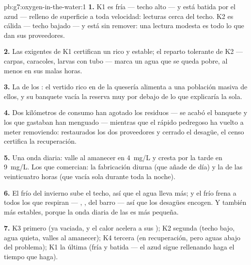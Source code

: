 \begin{solution}{pb:g7:oxygen-in-the-water:1}
\textbf{1.} K1 es fría --- techo alto --- y está batida por el azud ---
relleno de superficie a toda velocidad: lecturas cerca del techo. K2 es
cálida --- techo bajado --- y está sin remover: una lectura modesta es
todo lo que dan sus proveedores.

\textbf{2.} Las  exigentes de K1 certifican un  rico y
estable; el reparto tolerante de K2 --- carpas, caracoles, larvas con
tubo --- marca un agua que se queda pobre, al menos en sus malas horas.

\textbf{3.} La  de los : el vertido rico en
 de la quesería alimenta a una población masiva de
ellos, y su banquete vacía la reserva muy por debajo de lo que
explicaría la  sola.

\textbf{4.} Dos kilómetros de consumo han agotado los residuos --- se
acabó el banquete y los que gastaban han menguado --- mientras que el
rápido pedregoso ha vuelto a meter  removiendo: restaurados los
dos proveedores y cerrado el desagüe, el censo certifica la
recuperación.

\textbf{5.} Una onda diaria: valle al amanecer en \qty{4}{mg/L} y
cresta por la tarde en \qty{9}{mg/L}. Los que comercian: la fabricación
diurna (que añade de día) y la  de las veinticuatro horas
(que vacía sola durante toda la noche).

\textbf{6.} El frío del invierno sube el techo, así que el agua lleva
más; y el frío frena a todos los que respiran --- , ,
 del barro --- así que los desagües encogen. Y también
más estables, porque la onda diaria de las  es más pequeña.

\textbf{7.} K3 primero (ya vaciada, y el calor acelera a sus
); K2 segunda (techo bajo, agua quieta, valles al
amanecer); K4 tercera (en recuperación, pero aguas abajo del problema);
K1 la última (fría y batida --- el azud sigue rellenando haga el tiempo
que haga).


\end{solution}
